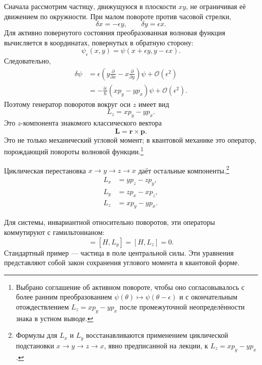 Сначала рассмотрим частицу, движущуюся в плоскости \(xy\), не ограничивая её движением по окружности. При малом повороте против часовой стрелки,
\begin{equation}
\delta x=-\epsilon y,
\qquad
\delta y=\epsilon x.
\end{equation}
Для активно повернутого состояния преобразованная волновая функция вычисляется в координатах, повернутых в обратную сторону:
\begin{equation}
\psi_\epsilon(x,y)
=\psi(x+\epsilon y,y-\epsilon x).
\end{equation}
Следовательно,
\begin{align}
\delta\psi
&=\epsilon\left(
y\frac{\partial}{\partial x}
-x\frac{\partial}{\partial y}
\right)\psi
+\mathcal O(\epsilon^2)\\
&=-\frac{i\epsilon}{\hbar}
\left(xp_y-yp_x\right)\psi
+\mathcal O(\epsilon^2).
\end{align}
Поэтому генератор поворотов вокруг оси \(z\) имеет вид
\begin{equation}
L_z=xp_y-yp_x.
\end{equation}
Это \(z\)-компонента знакомого классического вектора
\begin{equation}
\mathbf L=\mathbf r\times\mathbf p.
\end{equation}
Это не только механический угловой момент; в квантовой механике это оператор, порождающий повороты волновой функции.\footnote{Выбрано соглашение об активном повороте, чтобы оно согласовывалось с более ранним преобразованием \(\psi(\theta)\mapsto\psi(\theta-\epsilon)\) и с окончательным отождествлением \(L_z=xp_y-yp_x\) после промежуточной неопределённости знака в устном выводе.}

Циклическая перестановка \(x\to y\to z\to x\) даёт остальные компоненты.\footnote{Формулы для \(L_x\) и \(L_y\) восстанавливаются применением циклической подстановки \(x\to y\to z\to x\), явно предписанной на лекции, к \(L_z=xp_y-yp_x\).}
\begin{align}
L_x&=yp_z-zp_y,\\
L_y&=zp_x-xp_z,\\
L_z&=xp_y-yp_x.
\end{align}

Для системы, инвариантной относительно поворотов, эти операторы коммутируют с гамильтонианом:
\begin{equation}
[H,L_x]=[H,L_y]=[H,L_z]=0.
\end{equation}
Стандартный пример — частица в поле центральной силы. Эти уравнения представляют собой закон сохранения углового момента в квантовой форме.

